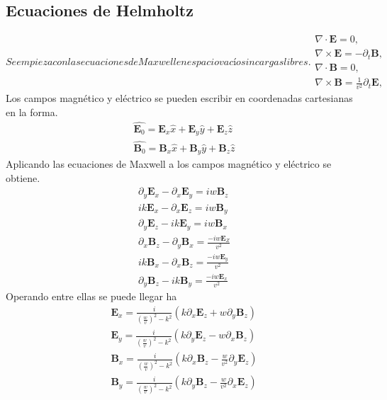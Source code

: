 \subsection{Ecuaciones de Helmholtz}
\begin{subequations}\label{Maxwell}
	Se empieza con las ecuaciones de Maxwell en espacio vacío sin cargas libres.
	\begin{align}
	\nabla \cdot \mathbf{E} = 0,\label{Primera}\\
	\nabla \times \mathbf{E} = - \partial_{t} \mathbf{B},\label{segunda}\\
	\nabla \cdot \mathbf{B} = 0,\label{tercera}\\
	\nabla \times \mathbf{B} =  \frac{1}{v^2} \partial_{t} \mathbf{E},\label{cuarta}
	\end{align}
\end{subequations}
Los campos magnético y eléctrico se pueden escribir en coordenadas cartesianas en la forma.
\begin{subequations}\label{Camposincidentes}
	\begin{align}
	\hat{\mathbf{E}_{0}} = \mathbf{E}_{x}\hat{x} + \mathbf{E}_{y}\hat{y}+\mathbf{E}_{z}\hat{z} \\
	\hat{\mathbf{B}_{0}} = \mathbf{B}_{x}\hat{x} + \mathbf{B}_{y}\hat{y}+\mathbf{B}_{z}\hat{z}
	\end{align}
\end{subequations}
Aplicando las ecuaciones de Maxwell a los campos magnético y eléctrico se obtiene.
\begin{subequations}\label{Camposexplicitos}
	\begin{align}
	\partial_{y}\mathbf{E}_{x}-\partial_{x}\mathbf{E}_{y}= i w \mathbf{B}_{z} \\
	i k \mathbf{E}_{x}-\partial_{x}\mathbf{E}_{z}= i w \mathbf{B}_{y} \\
	\partial_{y}\mathbf{E}_{z}-i k \mathbf{E}_{y}= i w \mathbf{B}_{x} \\
	\partial_{x}\mathbf{B}_{z}-\partial_{y}\mathbf{B}_{x}= \frac{-iw \mathbf{E}_{Z} }{v^2} \\
	i k \mathbf{B}_{x}-\partial_{x}\mathbf{B}_{z}= \frac{-iw \mathbf{E}_{y} }{v^2} \\
	\partial_{y}\mathbf{B}_{z}- i k \mathbf{B}_{y}= \frac{-iw \mathbf{E}_{x} }{v^2} 
	\end{align}
\end{subequations}
Operando entre ellas se puede llegar ha
\begin{subequations}\label{Ecuacionesdecampo}
	\begin{align}
	\mathbf{E}_{x} = \frac{i}{(\frac{w}{v})^2 - k^2} (k \partial_{x}\mathbf{E}_{z}+w \partial_{y} \mathbf{B}_{z}) \\
	\mathbf{E}_{y} = \frac{i}{(\frac{w}{v})^2 - k^2} (k \partial_{y}\mathbf{E}_{z}-w \partial_{x} \mathbf{B}_{z}) \\
	\mathbf{B}_{x} = \frac{i}{(\frac{w}{v})^2 - k^2} (k \partial_{x}\mathbf{B}_{z}- \frac{w}{v^2} \partial_{y} \mathbf{E}_{z}) \\
	\mathbf{B}_{y} = \frac{i}{(\frac{w}{v})^2 - k^2} (k \partial_{y}\mathbf{B}_{z}- \frac{w}{v^2} \partial_{x} \mathbf{E}_{z}) 
	\end{align}
\end{subequations}
